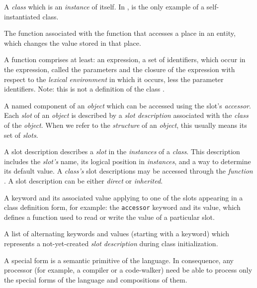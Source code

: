 \begin{optDefinition}
\begin{definitions}
       A {\em class} which is
    an {\em instance} of itself.  In \eulisp,  is the only
    example of a self-instantiated class.

     The function
    associated with the function that accesses a place in an entity, which
    changes the value stored in that place.

     A function
    comprises at least: an expression, a set of identifiers, which occur in the
    expression, called the parameters and the closure of the expression with
    respect to the {\em lexical environment} in which it occurs, less the
    parameter identifiers.  Note: this is not a definition of the class
    .

      A named component of an {\em object}
    which can be accessed using the slot's {\em accessor}.  Each {\em slot} of
    an {\em object} is described by a {\em slot description} associated with the
    {\em class} of the {\em object}.  When we refer to the {\em structure} of an
    {\em object}, this usually means its set of {\em slots}.

      A slot
    description describes a {\em slot} in the {\em instances} of a {\em class}.
    This description includes the {\em slot's} name, its logical position in
    {\em instances}, and a way to determine its default value.  A {\em class's}
    slot descriptions may be accessed through the {\em function}
    .  A slot description can be either
    {\em direct} or {\em inherited}.

      A keyword and its
    associated value applying to one of the slots appearing in a class
    definition form, for example: the {\tt accessor} keyword and its
    value, which defines a function used to read or write the value of a
    particular slot.

      A list
    of alternating keywords and values (starting with a keyword) which
    represents a not-yet-created {\em slot} {\em description} during class
    initialization.

      A special form is a
    semantic primitive of the language.  In consequence, any processor (for
    example, a compiler or a code-walker) need be able to process only the
    special forms of the language and compositions of them.


\end{definitions}
\end{optDefinition}
